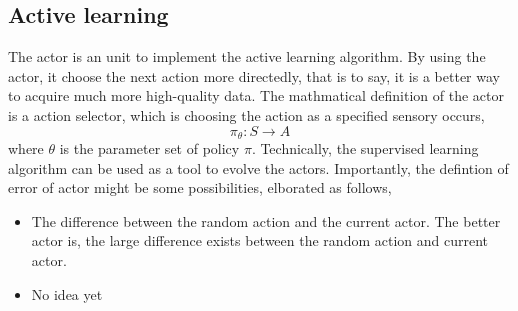 \documentclass{article}
\begin{document}
\subsection{Active learning}
\label{sec:activelearning}
The actor is an unit to implement the active learning algorithm. By using the actor, it choose the next action more directedly, that is to say, it is a better way to acquire much more high-quality data.
The mathmatical definition of the actor is a action selector, which is choosing the action as a specified sensory occurs,
\begin{equation}
  \label{eq:actormath}
  \pi_{\theta} : S \rightarrow A 
\end{equation}
where $\theta$ is the parameter set of policy $\pi$. Technically, the supervised learning algorithm can be used as a tool to evolve the actors. Importantly, the defintion of error of actor might be some possibilities, elborated as follows,
\begin{itemize}
\item The difference between the random action and the current actor. The better actor is, the large difference exists between the random action and current actor.
\item No idea yet

\end{itemize}
\end{document}
